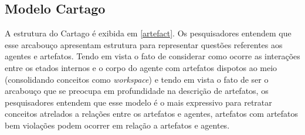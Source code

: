 \subsection{Modelo Cartago}

A estrutura do Cartago é exibida em \ref{artefact}. Os pesquisadores entendem que esse arcabouço apresentam estrutura para representar questões referentes aos agentes e artefatos. Tendo em vista o fato de considerar como ocorre as interações entre os etados internos e o corpo do agente com artefatos dispotos ao meio (consolidando conceitos como \textit{workspace}) e tendo em vista o fato de ser o arcabouço que se preocupa em profundidade na descrição de artefatos, os pesquisadores entendem que esse modelo é o mais expressivo para retratar conceitos atrelados a relações entre os artefatos e agentes, artefatos com artefatos bem  violações podem ocorrer em relação a artefatos e agentes.